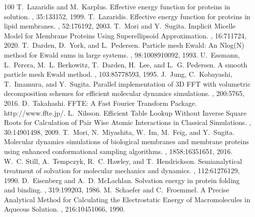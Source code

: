 \documentclass[a4paper,11pt,oneside,english]{sphinxmanual}
\begin{document}
\begin{sphinxthebibliography}{100}
T. Lazaridis and M. Karplus. Effective energy function for proteins in solution. , 35:133\textendash{}152, 1999.
T. Lazaridis. Effective energy function for proteins in lipid membranes. , 52:176\textendash{}192, 2003.
T. Mori and Y. Sugita. Implicit Micelle Model for Membrane Proteins Using Superellipsoid Approximation. , 16:711\textendash{}724, 2020.
T. Darden, D. York, and L. Pedersen. Particle mesh Ewald: An Nlog(N) method for Ewald sums in large systems. , 98:10089\textendash{}10092, 1993.
U. Essmann, L. Perera, M. L. Berkowitz, T. Darden, H. Lee, and L. G. Pedersen. A smooth particle mesh Ewald method. , 103:8577\textendash{}8593, 1995.
J. Jung, C. Kobayashi, T. Imamura, and Y. Sugita. Parallel implementation of 3D FFT with volumetric decomposition schemes for efficient molecular dynamics simulations. , 200:57\textendash{}65, 2016.
D. Takahashi. FFTE: A Fast Fourier Transform Package. http://www.ffte.jp/.
L. Nilsson. Efficient Table Lookup Without Inverse Square Roots for Calculation of Pair Wise Atomic Interactions in Classical Simulations. , 30:1490\textendash{}1498, 2009.
T. Mori, N. Miyashita, W. Im, M. Feig, and Y. Sugita. Molecular dynamics simulations of biological membranes and membrane proteins using enhanced conformational sampling algorithms. , 1858:1635\textendash{}1651, 2016.
W. C. Still, A. Tempczyk, R. C. Hawley, and T. Hendrickson. Semianalytical treatment of solvation for molecular mechanics and dynamics. , 112:6127\textendash{}6129, 1990.
D. Eisenberg and A. D. McLachlan. Solvation energy in protein folding and binding. , 319:199\textendash{}203, 1986.
M. Schaefer and C. Froemmel. A Precise Analytical Method for Calculating the Electrostatic Energy of Macromolecules in Aqueous Solution. , 216:1045\textendash{}1066, 1990.

\end{sphinxthebibliography}
\end{document}

